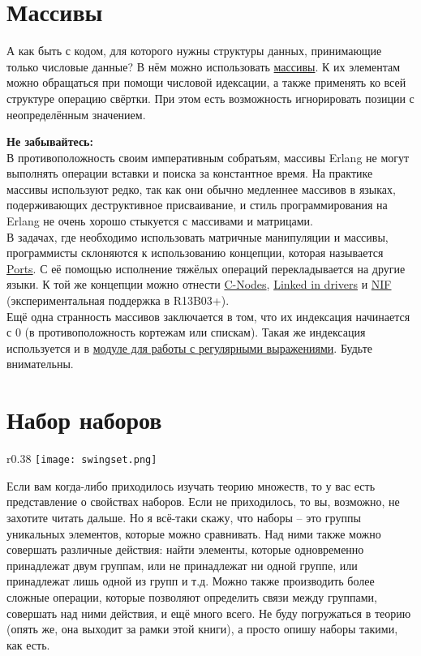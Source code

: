 \section{Массивы}
\label{arrays}
А как быть с кодом, для которого нужны структуры данных, принимающие только числовые данные?
В нём можно использовать \href{http://erldocs.com/R15B/stdlib/array.html}{массивы}.
К их элементам можно обращаться при помощи числовой идексации, а также применять ко всей структуре операцию свёртки.
При этом есть возможность игнорировать позиции с неопределённым значением.
\colorbox{lorange}
{
    \begin{minipage}{1.0\linewidth}
        \textbf{Не забывайтесь:}\\
В противоположность своим императивным собратьям, массивы Erlang не могут выполнять операции вставки и поиска за константное время.
На практике массивы используют редко, так как они обычно медленнее массивов в языках, подерживающих деструктивное присваивание, и стиль программирования на Erlang не очень хорошо стыкуется с массивами и матрицами.\\
В задачах, где необходимо использовать матричные манипуляции и массивы, программисты склоняются к использованию концепции, которая называется \href{http://www.erlang.org/doc/tutorial/c\_port.html}{Ports}.
С её помощью исполнение тяжёлых операций перекладывается на другие языки.
К той же концепции можно отнести \href{http://www.erlang.org/doc/tutorial/cnode.html}{C-Nodes}, \href{http://www.erlang.org/doc/tutorial/c\_portdriver.html}{Linked in drivers} и \href{http://erldocs.com/R15B/erts/erl\_nif.html}{NIF} (экспериментальная поддержка в R13B03+).\\
Ещё одна странность массивов заключается в том, что их индексация начинается с 0 (в противоположность кортежам или спискам).
Такая же индексация используется и в \href{http://erldocs.com/R15B/stdlib/re.html}{модуле для работы с регулярными выражениями}.
Будьте внимательны.
    \end{minipage}
}
\section{Набор наборов}
\label{a-set-of-sets}
\begin{wrapfigure}{r}{0.38\linewidth}
    \texttt{[image: swingset.png]}
\end{wrapfigure}
Если вам когда\--либо приходилось изучать теорию множеств, то у вас есть представление о свойствах наборов.
Если не приходилось, то вы, возможно, не захотите читать дальше.
Но я всё\--таки скажу, что наборы \--- это группы уникальных элементов, которые можно сравнивать.
Над ними также можно совершать  различные действия: найти элементы, которые одновременно принадлежат двум группам, или не принадлежат ни одной группе, или принадлежат лишь одной из групп и т.д.
Можно также производить более сложные операции, которые позволяют определить связи между группами, совершать над ними действия, и ещё много всего.
Не буду погружаться в теорию (опять же, она выходит за рамки этой книги), а просто опишу наборы такими, как есть.

